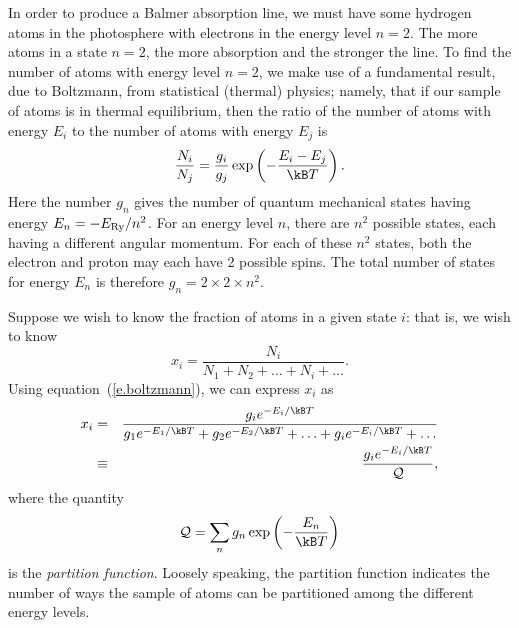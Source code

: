In order to produce a Balmer absorption line, we must have some hydrogen atoms in the photosphere with electrons in the energy level $n=2$. The more atoms in a state $n=2$, the more absorption and the stronger the line. To find the number of atoms with energy level $n=2$, we make use of a fundamental result, due to Boltzmann, from statistical (thermal) physics; namely, that if our sample of atoms is in thermal equilibrium, then the ratio of the number of atoms with energy $E_{i}$ to the number of atoms with energy $E_{j}$ is
\begin{equation}\label{e.boltzmann}
\frac{N_{i}}{N_{j}} = \frac{g_{i}}{g_{j}} 
\exp\left(-\frac{E_{i}-E_{j}}{\kB T}\right).
\end{equation}
Here the number $g_{n}$ gives the number of quantum mechanical states having energy $E_{n} = -E_{\mathrm{Ry}}/n^{2}$. For an energy level $n$, there are $n^{2}$ possible states, each having a different angular momentum. For each of these $n^{2}$ states, both the electron and proton may each have 2 possible spins. The total number of states for energy $E_{n}$ is therefore $g_{n} = 2\times2\times n^{2}$.

Suppose we wish to know the fraction of atoms in a given state $i$: that is, we wish to know
\[	x_{i} = \frac{N_{i}}{N_{1}+N_{2}+\ldots+N_{i}+\ldots} . \]
Using equation~(\ref{e.boltzmann}), we can express $x_{i}$ as 
\begin{eqnarray}
  x_{i} &=& \frac{g_{i}e^{-E_{i}/\kB T}}{g_{1}e^{-E_{1}/\kB T}+g_{2}e^{-E_{2}/\kB T}+\ldots+g_{i}e^{-E_{i}/\kB T}+\ldots} \nonumber\\
        &\equiv& \frac{g_{i}e^{-E_{i}/\kB T}}{\pfcn},
\end{eqnarray}
where the quantity 
\begin{equation}\label{e.partition-function}
	\pfcn = \sum_{n} g_{n}\exp\left(-\frac{E_{n}}{\kB T}\right)
\end{equation}
is the \emph{partition function}. Loosely speaking, the partition function indicates the number of ways the sample of atoms can be partitioned among the different energy levels.

